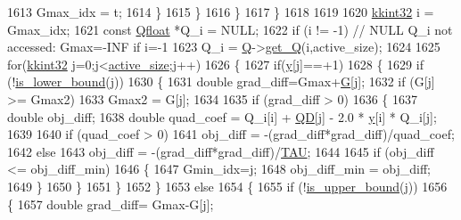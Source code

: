 \begin{DoxyCode}
1613           Gmax\_idx = t;
1614         \}
1615       \}
1616     \}
1617   \}
1618 
1619 
1620   \hyperlink{namespace_k_k_b_a8fa4952cc84fda1de4bec1fbdd8d5b1b}{kkint32} i = Gmax\_idx;
1621   \textcolor{keyword}{const} \hyperlink{namespace_s_v_m289___m_f_s_a440663a1b8d42bc10329401883645ae1}{Qfloat} *Q\_i = NULL;
1622   \textcolor{keywordflow}{if}  (i != -1) \textcolor{comment}{// NULL Q\_i not accessed: Gmax=-INF if i=-1}
1623     Q\_i = \hyperlink{class_s_v_m289___m_f_s_1_1_solver_a5655aaf1c92b609e8ed2087e08b053eb}{Q}->\hyperlink{class_s_v_m289___m_f_s_1_1_q_matrix_a80b3d1ac0e040add9b39ff77f8383ddd}{get\_Q}(i,active\_size);
1624 
1625   \textcolor{keywordflow}{for}(\hyperlink{namespace_k_k_b_a8fa4952cc84fda1de4bec1fbdd8d5b1b}{kkint32} j=0;j<\hyperlink{class_s_v_m289___m_f_s_1_1_solver_a8996bbbda51e87b157af0e8c4ad78411}{active\_size};j++)
1626   \{
1627     \textcolor{keywordflow}{if}(\hyperlink{class_s_v_m289___m_f_s_1_1_solver_ab9586d6d550d7806b9582b9279217ff5}{y}[j]==+1)
1628     \{
1629       \textcolor{keywordflow}{if} (!\hyperlink{class_s_v_m289___m_f_s_1_1_solver_a2fe8c6cd332cef1fe1622fb6faa98e19}{is\_lower\_bound}(j))
1630       \{
1631         \textcolor{keywordtype}{double} grad\_diff=Gmax+\hyperlink{class_s_v_m289___m_f_s_1_1_solver_a96465496d62f5c9566275270d7a54a4f}{G}[j];
1632         \textcolor{keywordflow}{if} (G[j] >= Gmax2)
1633           Gmax2 = G[j];
1634 
1635         \textcolor{keywordflow}{if}  (grad\_diff > 0)
1636         \{
1637           \textcolor{keywordtype}{double} obj\_diff; 
1638           \textcolor{keywordtype}{double} quad\_coef = Q\_i[i] + \hyperlink{class_s_v_m289___m_f_s_1_1_solver_a5bb379d32ebad294ad384244fee7e8a5}{QD}[j] - 2.0 * \hyperlink{class_s_v_m289___m_f_s_1_1_solver_ab9586d6d550d7806b9582b9279217ff5}{y}[i] * Q\_i[j];
1639 
1640           \textcolor{keywordflow}{if}  (quad\_coef > 0)
1641             obj\_diff = -(grad\_diff*grad\_diff)/quad\_coef;
1642           \textcolor{keywordflow}{else}
1643             obj\_diff = -(grad\_diff*grad\_diff)/\hyperlink{svm2_8cpp_a3d8c9c145887af5174ba4cc6789862ad}{TAU};
1644 
1645           \textcolor{keywordflow}{if}  (obj\_diff <= obj\_diff\_min)
1646           \{
1647             Gmin\_idx=j;
1648             obj\_diff\_min = obj\_diff;
1649           \}
1650         \}
1651       \}
1652     \}
1653     \textcolor{keywordflow}{else}
1654     \{
1655       \textcolor{keywordflow}{if}  (!\hyperlink{class_s_v_m289___m_f_s_1_1_solver_a9648a7dd5e4e6818cdf255ffb1340187}{is\_upper\_bound}(j))
1656       \{
1657         \textcolor{keywordtype}{double} grad\_diff= Gmax-G[j];

\end{DoxyCode}
